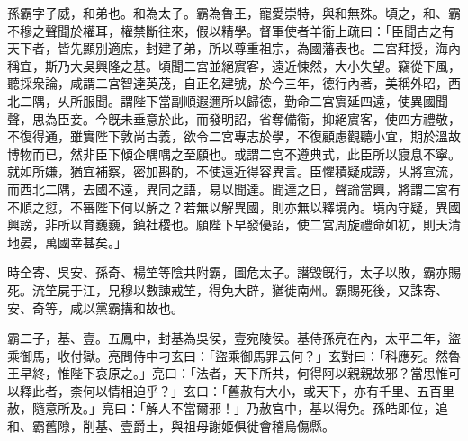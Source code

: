 
\begin{pinyinscope}
孫霸字子威，和弟也。和為太子。霸為魯王，寵愛崇特，與和無殊。頃之，和、霸不穆之聲聞於權耳，權禁斷往來，假以精學。督軍使者羊衜上疏曰：「臣聞古之有天下者，皆先顯別適庶，封建子弟，所以尊重祖宗，為國藩表也。二宮拜授，海內稱宜，斯乃大吳興隆之基。頃聞二宮並絕賔客，遠近悚然，大小失望。竊從下風，聽採衆論，咸謂二宮智達英茂，自正名建號，於今三年，德行內著，美稱外昭，西北二隅，乆所服聞。謂陛下當副順遐邇所以歸德，勤命二宮賔延四遠，使異國聞聲，思為臣妾。今旣未垂意於此，而發明詔，省奪備衞，抑絕賔客，使四方禮敬，不復得通，雖實陛下敦尚古義，欲令二宮專志於學，不復顧慮觀聽小宜，期於溫故博物而已，然非臣下傾企喁喁之至願也。或謂二宮不遵典式，此臣所以寢息不寧。就如所嫌，猶宜補察，密加斟酌，不使遠近得容異言。臣懼積疑成謗，乆將宣流，而西北二隅，去國不遠，異同之語，易以聞達。聞達之日，聲論當興，將謂二宮有不順之愆，不審陛下何以解之？若無以解異國，則亦無以釋境內。境內守疑，異國興謗，非所以育巍巍，鎮社稷也。願陛下早發優詔，使二宮周旋禮命如初，則天清地晏，萬國幸甚矣。」

時全寄、吳安、孫奇、楊笁等陰共附霸，圖危太子。譖毀旣行，太子以敗，霸亦賜死。流笁屍于江，兄穆以數諫戒笁，得免大辟，猶徙南州。霸賜死後，又誅寄、安、奇等，咸以黨霸搆和故也。

霸二子，基、壹。五鳳中，封基為吳侯，壹宛陵侯。基侍孫亮在內，太平二年，盜乘御馬，收付獄。亮問侍中刁玄曰：「盜乘御馬罪云何？」玄對曰：「科應死。然魯王早終，惟陛下哀原之。」亮曰：「法者，天下所共，何得阿以親親故邪？當思惟可以釋此者，柰何以情相迫乎？」玄曰：「舊赦有大小，或天下，亦有千里、五百里赦，隨意所及。」亮曰：「解人不當爾邪！」乃赦宮中，基以得免。孫皓即位，追和、霸舊隙，削基、壹爵土，與祖母謝姬俱徙會稽烏傷縣。


\end{pinyinscope}